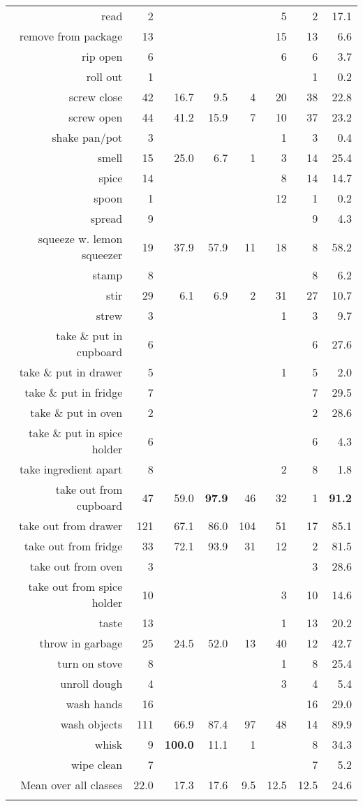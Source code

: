 \begin{tabular}{r r r@{\ \ }r@{\ \ }r@{\ \ }r@{\ \ }r r}
read & 2 &  &  &  & 5 & 2 & 17.1 \\
remove from package & 13 &  &  &  & 15 & 13 & 6.6 \\
rip open & 6 &  &  &  & 6 & 6 & 3.7 \\
roll out & 1 &  &  &  &  & 1 & 0.2 \\
screw close & 42 & 16.7 & 9.5 & 4 & 20 & 38 & 22.8 \\
screw open & 44 & 41.2 & 15.9 & 7 & 10 & 37 & 23.2 \\
shake pan/pot & 3 &  &  &  & 1 & 3 & 0.4 \\
smell & 15 & 25.0 & 6.7 & 1 & 3 & 14 & 25.4 \\
spice & 14 &  &  &  & 8 & 14 & 14.7 \\
spoon & 1 &  &  &  & 12 & 1 & 0.2 \\
spread & 9 &  &  &  &  & 9 & 4.3 \\
squeeze w. lemon squeezer & 19 & 37.9 & 57.9 & 11 & 18 & 8 & 58.2 \\
stamp & 8 &  &  &  &  & 8 & 6.2 \\
stir & 29 & 6.1 & 6.9 & 2 & 31 & 27 & 10.7 \\
strew & 3 &  &  &  & 1 & 3 & 9.7 \\
take \& put in cupboard & 6 &  &  &  &  & 6 & 27.6 \\
take \& put in drawer & 5 &  &  &  & 1 & 5 & 2.0 \\
take \& put in fridge & 7 &  &  &  &  & 7 & 29.5 \\
take \& put in oven & 2 &  &  &  &  & 2 & 28.6 \\
take \& put in spice holder & 6 &  &  &  &  & 6 & 4.3 \\
take ingredient apart & 8 &  &  &  & 2 & 8 & 1.8 \\
take out from cupboard & 47 & 59.0 & \textbf{97.9} & 46 & 32 & 1 & \textbf{91.2} \\
take out from drawer & 121 & 67.1 & 86.0 & 104 & 51 & 17 & 85.1 \\
take out from fridge & 33 & 72.1 & 93.9 & 31 & 12 & 2 & 81.5 \\
take out from oven & 3 &  &  &  &  & 3 & 28.6 \\
take out from spice holder & 10 &  &  &  & 3 & 10 & 14.6 \\
taste & 13 &  &  &  & 1 & 13 & 20.2 \\
throw in garbage & 25 & 24.5 & 52.0 & 13 & 40 & 12 & 42.7 \\
turn on stove & 8 &  &  &  & 1 & 8 & 25.4 \\
unroll dough & 4 &  &  &  & 3 & 4 & 5.4 \\
wash hands & 16 &  &  &  &  & 16 & 29.0 \\
wash objects & 111 & 66.9 & 87.4 & 97 & 48 & 14 & 89.9 \\
whisk & 9 & \textbf{100.0} & 11.1 & 1 &  & 8 & 34.3 \\
wipe clean & 7 &  &  &  &  & 7 & 5.2 \\
\cmidrule(lr){1-1} \cmidrule(lr){2-2} \cmidrule(lr){3-7} \cmidrule(lr){8-8}
Mean over all classes&22.0&17.3&17.6&9.5&12.5&12.5&24.6
\\ \bottomrule \\ \end{tabular}
